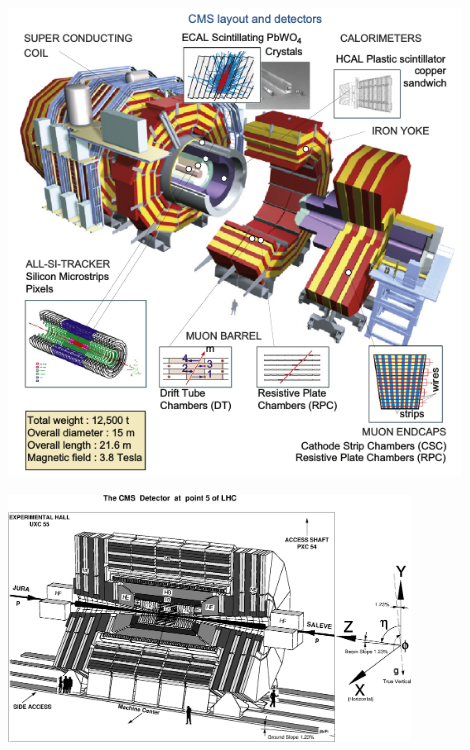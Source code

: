 \clearpage
\vspace{5mm}
\begin{minipage}{0.95\linewidth}
\begin{center}
\mbox{\includegraphics[height=0.7\textwidth, width=0.9\textwidth]{THESISPLOTS/CMS_LAYOUT_AND_DETECTORS.png}} 
\label{fig:CMS-DET}
\end{center}
\end{minipage}

\vspace{5mm}
\begin{minipage}{0.95\linewidth}
\begin{center}
\mbox{\includegraphics[height=0.55\textwidth, width=0.8\textwidth]{THESISPLOTS/CMS_DETECTOR.eps}} 
\label{fig:CMSDCORD}
\end{center}
\end{minipage}

